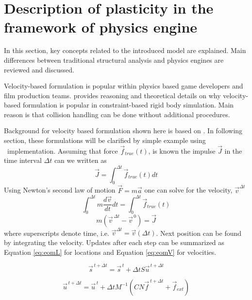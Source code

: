 \section{Description of plasticity in the framework of physics engine}

In this section, key concepts related to the introduced model are explained. Main differences between 
traditional structural analysis and physics engines are reviewed and discussed.

Velocity-based formulation is  popular within physics based game
developers and film production teams.
 \citet[p.~45]{erleben.thesis} provides reasoning and theoretical details on why 
velocity-based formulation is  popular in constraint-based rigid body simulation. 
Main reason is that collision handling can be done without additional procedures.

Background
for velocity based formulation shown here is based on  \citet[p.~45-50]{erleben.thesis}.
In following section, these formulations will be clarified by simple example using \bullet\ implementation.
Assuming that force $\vec{f}_{true}(t)$, is known the impulse $\vec{J}$
in the time interval $\Delta t $ can we written as
\begin{equation} \label{eq:impulseIntegral}
\vec{J} = \int_{0}^{\Delta t} \vec{f}_{true}(t) dt
\end{equation}
Using Newton's second law of motion $\vec{F}=m\vec{a}$ one can solve for the velocity,
$\vec{v}^{\Delta t}$
\begin{equation} \label{eq:impulseIntegraWithNewton}
\int_{0}^{\Delta t} m \frac{d\vec{v}}{dt}dt= \int_{0}^{\Delta t} \vec{f}_{true}(t)
\end{equation}
\begin{equation} \label{eq:impulse}
m(\vec{v}^{\, \Delta t} - \vec{v}^{\, 0})=\vec{J}
\end{equation}
where superscripts denote time, i.e. ${\vec{v}}^{\Delta t}=\vec{v}(\Delta t)$.
Next position can be found
by integrating the velocity.
Updates after each step can be summarized as Equation
 \ref{eq:eomL} for locations and  Equation 
\ref{eq:eomV} for velocities. 

\begin{equation} \label{eq:eomL} %
\vec{s}^{\, t+\Delta t} = \vec{s}^{\, t}+\Delta t S \vec{u}^{\, t+\Delta t}
\end{equation}

\begin{equation} \label{eq:eomV}
\vec{u}^{\, t+\Delta t} = \vec{u}^{\, t}+\Delta t M^{-1}(C N \vec{f}^{\ t+\Delta t} + \vec{f}_{ext}) 
\end{equation}

